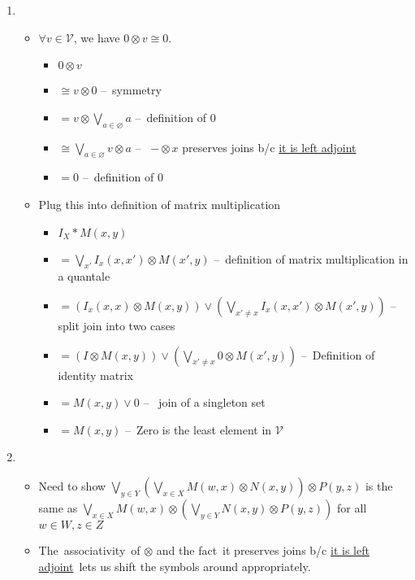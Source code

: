 \begin{enumerate}
    \item
          \begin{itemize}
            \item $\forall v \in \mathcal{V}$, we have $0 \otimes v \cong 0$.
              \begin{itemize}
              \item $0 \otimes v$
              \item $\cong v \otimes 0$ -- \,symmetry\,
              \item $= v \otimes \bigvee_{a \in \varnothing} a$ -- \,definition of $0$\,
              \item $\cong \bigvee_{a \in \varnothing} v \otimes a$ -- \, $-\otimes x$ preserves joins b/c \href{doc/1 math/Seven Sketches in Compositionality/Chapter 2: Resource theories/5 Computing presented V-categories with matrix mult/1 Monoidal closed preorders/5 SMP currying}{it is left adjoint}\,
              \item $= 0$ -- \,definition of 0\,
            \end{itemize}
          \item Plug this into definition of matrix multiplication
          \begin{itemize}
            \item $I_X * M(x,y)$
            \item $= \bigvee_{x'}I_x(x,x')\otimes M(x',y)$ -- \,definition of matrix multiplication in a quantale\,
            \item $=(I_x(x,x)\otimes M(x,y))\vee(\bigvee_{x'\ne x}I_x(x,x')\otimes M(x',y))$ -- \,split join into two cases\,
            \item $=(I\otimes M(x,y))\vee(\bigvee_{x'\ne x}0\otimes M(x',y))$ -- \,Definition of identity matrix\,
            \item $=M(x,y)\vee 0$ -- \, join of a singleton set\,
            \item $=M(x,y)$ -- \,Zero is the least element in $\mathcal{V}$\,
          \end{itemize}
        \end{itemize}
        \item \begin{itemize}
            \item Need to show $\underset{y \in Y}\bigvee (\underset{x\in X}\bigvee M(w,x)\otimes N(x,y))\otimes P(y,z)$ is the same as $\underset{x \in X}\bigvee M(w,x)\otimes(\underset{y \in Y}\bigvee N(x,y) \otimes P(y,z))$ for all $w \in W,z \in Z$
            \item The \,associativity\, of $\otimes$ and the fact \,it preserves joins b/c \href{doc/1 math/Seven Sketches in Compositionality/Chapter 2: Resource theories/5 Computing presented V-categories with matrix mult/1 Monoidal closed preorders/5 SMP currying}{it is left adjoint}\, lets us shift the symbols around appropriately.

       \end{itemize}
  \end{enumerate}

